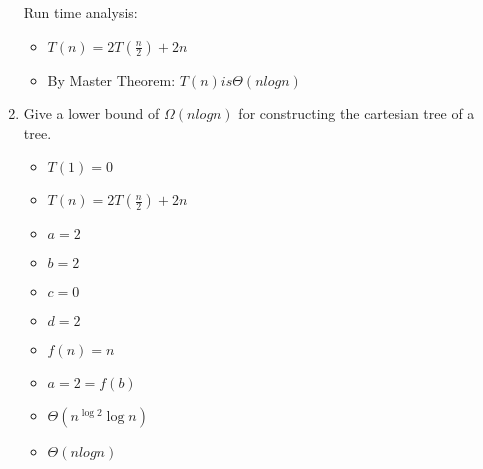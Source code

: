 \documentclass[12pt]{article}
\begin{document}
\begin{enumerate}
    Run time analysis:
    \begin{itemize}
        \item $T(n) = 2T(\frac{n}{2}) + 2n$
        \item By Master Theorem: $T(n) is \Theta(nlogn)$
    \end{itemize}

\item Give a lower bound of $\Omega(nlogn)$ for constructing the cartesian tree
    of a tree.

    \begin{itemize}
        \item $T(1) = 0$
        \item $T(n) = 2T(\frac{n}{2}) + 2n$
        \item $a = 2$
        \item $b = 2$
        \item $c = 0$
        \item $d = 2$
        \item $f(n) = n$
        \item $a = 2 = f(b)$
        \item $\Theta(n^{\log 2} \log n)$
        \item $\Theta(nlogn)$
    \end{itemize}

\end{enumerate}
\end{document}
